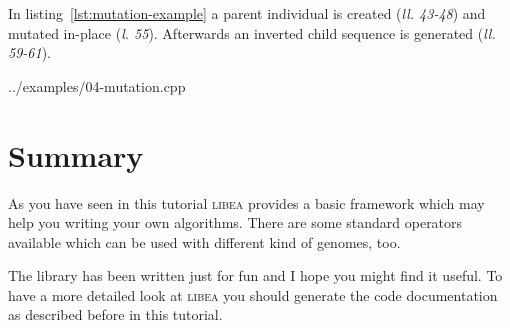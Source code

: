 \documentclass[a4paper]{article}
\begin{document}
In listing~\ref{lst:mutation-example} a parent individual is created (\textit{ll. 43-48}) and mutated in-place (\textit{l. 55}). Afterwards an inverted child sequence is generated (\textit{ll. 59-61}).

\begin{lstinputlisting}[caption=mutation operators,label=lst:mutation-example]{../examples/04-mutation.cpp}
\end{lstinputlisting}

\section{Summary}

As you have seen in this tutorial \textsc{libea} provides a basic framework which may help you writing your own algorithms. There are some standard operators available which can be used with different kind of genomes, too.

The library has been written just for fun and I hope you might find it useful. To have a more detailed look at \textsc{libea} you should generate the code documentation as described before in this tutorial.
\end{document}
